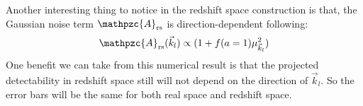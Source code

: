 \documentclass[prd,amsmath,amssymb,floatfix,superscriptaddress,nofootinbib,twocolumn]{revtex4-1}
\def\be{\begin{equation}}
\def\ee{\end{equation}}
\newcommand{\rs}{\rm rs}
\newcommand{\vk}{\vec{k}}
\begin{document}
Another interesting thing to notice in the redshift space construction is that, the Gaussian noise term $\mathpzc{A}_{\rs}$ is direction-dependent following:
\be 
\mathpzc{A}_{\rs}(\vk_l)\propto(1+f(a=1)\mu_{\vk_l}^{2})
\ee 
One benefit we can take from this numerical result is that the projected detectability in redshift space still will not depend on the direction of $\vk_l$. So the error bars will be the same for both real space and redshift space.




\end{document}
